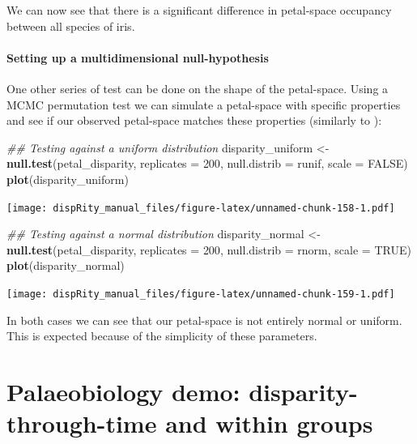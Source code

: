 \documentclass[]{book}
\newenvironment{Shaded}{\begin{snugshade}}{\end{snugshade}}
\newcommand{\CommentTok}[1]{\textcolor[rgb]{0.56,0.35,0.01}{\textit{#1}}}
\newcommand{\DataTypeTok}[1]{\textcolor[rgb]{0.13,0.29,0.53}{#1}}
\newcommand{\DecValTok}[1]{\textcolor[rgb]{0.00,0.00,0.81}{#1}}
\newcommand{\KeywordTok}[1]{\textcolor[rgb]{0.13,0.29,0.53}{\textbf{#1}}}
\newcommand{\NormalTok}[1]{#1}
\newcommand{\OtherTok}[1]{\textcolor[rgb]{0.56,0.35,0.01}{#1}}
\newcommand{\StringTok}[1]{\textcolor[rgb]{0.31,0.60,0.02}{#1}}
\begin{document}
We can now see that there is a significant difference in petal-space occupancy between all species of iris.

\hypertarget{setting-up-a-multidimensional-null-hypothesis}{%
\subsubsection{Setting up a multidimensional null-hypothesis}\label{setting-up-a-multidimensional-null-hypothesis}}

One other series of test can be done on the shape of the petal-space.
Using a MCMC permutation test we can simulate a petal-space with specific properties and see if our observed petal-space matches these properties (similarly to \citet{diaz2016global}):

\begin{Shaded}
\begin{Highlighting}[]
\CommentTok{## Testing against a uniform distribution}
\NormalTok{disparity_uniform <-}\StringTok{ }\KeywordTok{null.test}\NormalTok{(petal_disparity, }\DataTypeTok{replicates =} \DecValTok{200}\NormalTok{,}
    \DataTypeTok{null.distrib =}\NormalTok{ runif, }\DataTypeTok{scale =} \OtherTok{FALSE}\NormalTok{)}
\KeywordTok{plot}\NormalTok{(disparity_uniform)}
\end{Highlighting}
\end{Shaded}

\texttt{[image: dispRity\_manual\_files/figure-latex/unnamed-chunk-158-1.pdf]}

\begin{Shaded}
\begin{Highlighting}[]
\CommentTok{## Testing against a normal distribution}
\NormalTok{disparity_normal <-}\StringTok{ }\KeywordTok{null.test}\NormalTok{(petal_disparity, }\DataTypeTok{replicates =} \DecValTok{200}\NormalTok{,}
    \DataTypeTok{null.distrib =}\NormalTok{ rnorm, }\DataTypeTok{scale =} \OtherTok{TRUE}\NormalTok{)}
\KeywordTok{plot}\NormalTok{(disparity_normal)}
\end{Highlighting}
\end{Shaded}

\texttt{[image: dispRity\_manual\_files/figure-latex/unnamed-chunk-159-1.pdf]}

In both cases we can see that our petal-space is not entirely normal or uniform.
This is expected because of the simplicity of these parameters.

\hypertarget{palaeobiology-demo-disparity-through-time-and-within-groups}{%
\chapter{Palaeobiology demo: disparity-through-time and within groups}\label{palaeobiology-demo-disparity-through-time-and-within-groups}}
\end{document}
